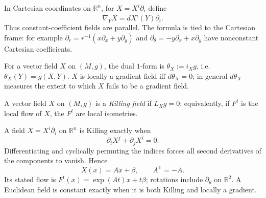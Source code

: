 \begin{definition}
  \label{def:pet-ch2-covariant-derivative-euclidean}
  \leanok
  In Cartesian
  coordinates on $\mathbb{R}^n$, for $X=X^i\partial_i$ define
  \[
    \nabla_YX=dX^i(Y)\partial_i.
  \]
  Thus constant-coefficient fields are parallel. The formula is tied to the
  Cartesian frame: for example
  $\partial_r=r^{-1}(x\partial_x+y\partial_y)$ and
  $\partial_\theta=-y\partial_x+x\partial_y$ have nonconstant Cartesian
  coefficients.
\end{definition}

\begin{definition}
  \label{def:pet-ch2-dual-one-form}
  \leanok
  For a vector field $X$ on $(M,g)$, the dual $1$-form is
  $\theta_X:=i_Xg$, i.e.\ $\theta_X(Y)=g(X,Y)$. $X$ is locally a gradient field
  iff $d\theta_X=0$; in general $d\theta_X$ measures the extent to which $X$
  fails to be a gradient field.
\end{definition}

\begin{definition}
  \label{def:pet-ch2-killing-field}
  \leanok
  A vector field $X$ on $(M,g)$ is a \emph{Killing field} if $L_Xg=0$;
  equivalently, if $F^t$ is the local flow of $X$, the $F^t$ are local
  isometries.
\end{definition}

\begin{remark}
  \label{rem:pet-ch2-killing-field-euclidean}
  \leanok
  A field
  $X=X^i\partial_i$ on $\mathbb{R}^n$ is Killing exactly when
  \[
    \partial_iX^j+\partial_jX^i=0.
  \]
  \sketch
  Differentiating and cyclically permuting the indices forces all second
  derivatives of the components to vanish. Hence
  \[
    X(x)=Ax+\beta,\qquad A^{\mathsf T}=-A.
  \]
  Its stated flow is $F^t(x)=\exp(At)x+t\beta$; rotations include
  $\partial_\theta$ on $\mathbb{R}^2$. A Euclidean field is constant exactly
  when it is both Killing and locally a gradient.
\end{remark}

